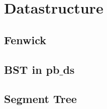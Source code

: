 \section{Datastructure}
\subsection{Fenwick}


\subsection{BST in pb$\_$ds}


\subsection{Segment Tree}


